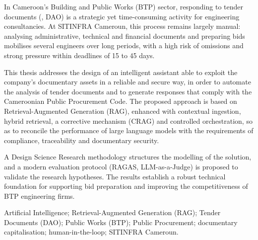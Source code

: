 In Cameroon's Building and Public Works (BTP) sector, responding to tender
documents (, DAO) is a strategic yet
time-consuming activity for engineering consultancies. At SITINFRA Cameroun,
this process remains largely manual: analysing administrative, technical and
financial documents and preparing bids mobilises several engineers over long
periods, with a high risk of omissions and strong pressure within deadlines of
15 to 45 days.

This thesis addresses the design of an intelligent assistant able to exploit the
company's documentary assets in a reliable and secure way, in order to automate
the analysis of tender documents and to generate responses that comply with the
Cameroonian Public Procurement Code. The proposed approach is based on
Retrieval-Augmented Generation (RAG), enhanced with contextual ingestion,
hybrid retrieval, a corrective mechanism (CRAG) and controlled orchestration,
so as to reconcile the performance of large language models with the
requirements of compliance, traceability and documentary security.

A Design Science Research methodology structures the modelling of the solution,
and a modern evaluation protocol (RAGAS, LLM-as-a-Judge) is proposed to validate
the research hypotheses. The results establish a robust technical foundation for
supporting bid preparation and improving the competitiveness of BTP engineering
firms.

\vspace{0.6em}
\begin{btpbox}[Keywords]
Artificial Intelligence; Retrieval-Augmented Generation (RAG); Tender Documents
(DAO); Public Works (BTP); Public Procurement; documentary capitalisation;
human-in-the-loop; SITINFRA Cameroun.
\end{btpbox}

\btpEndMark
\clearpage
